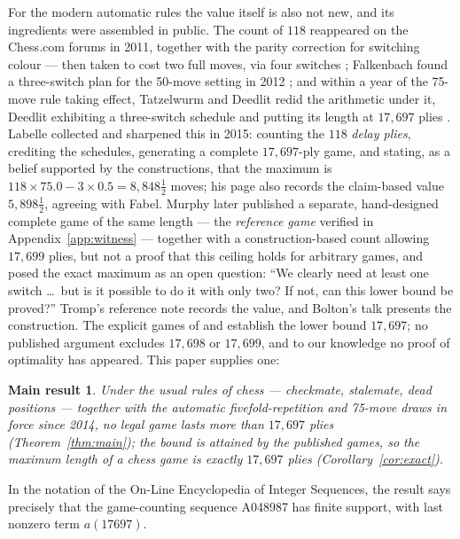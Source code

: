 \documentclass[11pt]{article}
\theoremstyle{definition}
\theoremstyle{remark}
\theoremstyle{plain}
\newtheorem*{mainresult}{Main result}
\begin{document}
For the modern automatic rules the value itself is also not new, and its
ingredients were assembled in public. The count of $118$ reappeared on the
Chess.com forums in 2011, together with the parity correction for
switching colour --- then taken to cost two full moves, via four
switches \cite{forum2011}; Falkenbach found a three-switch plan for the
50-move setting in 2012 \cite{forum2011}; and within a year of the
75-move rule taking effect, Tatzelwurm and Deedlit redid the arithmetic
under it, Deedlit exhibiting a three-switch schedule and putting its
length at $17{,}697$ plies \cite{forum2015}. Labelle
\cite{labelle2015longest} collected and sharpened this in 2015: counting
the $118$ \emph{delay plies}, crediting the schedules, generating a
complete $17{,}697$-ply game, and stating, as a belief supported by the
constructions, that the maximum is
$118 \times 75.0 - 3 \times 0.5 = 8{,}848\tfrac12$ moves; his page also
records the claim-based value $5{,}898\tfrac12$, agreeing with Fabel.
Murphy \cite{murphy2020longest} later published a separate, hand-designed
complete game of the same length --- the \emph{reference game} verified
in Appendix~\ref{app:witness} --- together with a construction-based
count allowing $17{,}699$ plies, but not a proof that this ceiling
holds for arbitrary games, and posed the exact
maximum as an open question: ``We
clearly need at least one switch \dots\ but is it possible to do it with
only two? If not, can this lower bound be proved?'' Tromp's reference
note \cite{tromp-longest} records the value, and Bolton's talk
\cite{bolton2021} presents the construction. The explicit games of
\cite{labelle2015longest} and \cite{murphy2020longest} establish the
lower bound $17{,}697$; no published argument excludes $17{,}698$ or
$17{,}699$, and to our knowledge no proof of optimality has appeared.
This paper supplies one:

\begin{mainresult}
Under the usual rules of chess --- checkmate, stalemate, dead positions
--- together with the automatic fivefold-repetition and 75-move draws in
force since 2014, no legal game lasts more than $17{,}697$ plies
(Theorem~\ref{thm:main}); the bound is attained by the published games,
so the maximum length of a chess game is exactly $17{,}697$ plies
(Corollary~\ref{cor:exact}).
\end{mainresult}

In the notation of the On-Line Encyclopedia of Integer Sequences, the
result says precisely that the game-counting sequence A048987
\cite{oeisA048987} has finite support, with last nonzero term
$a(17697)$.
\end{document}
